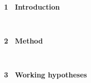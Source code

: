 \documentclass[portrait,a0,posterdraft]{a0poster} %
\def\exMinipage{782mm}
\def\exHalfMinipage{380mm}
\def\exSubHalfMinipage{369mm}
\begin{document}
{{{\begin{minipage}[t]{\exMinipage}
\begin{minipage}[t]{\exHalfMinipage}
\begin{minipage}[t]{\exHalfMinipage}%
\LARGE{\white \bf1 \ Introduction}\\[-10pt]
\begin{minipage}[t]{\exSubHalfMinipage}
\begin{mdframed}[style=smallframe]
\introtext
\end{mdframed}
\end{minipage} 
\end{minipage}%
\\[40pt]
\begin{minipage}[t]{\exHalfMinipage}%
\LARGE {\white  \bf 2 \ Method}\\[-10pt]
\begin{minipage}[t]{\exSubHalfMinipage}
\begin{mdframed}[style=smallframe]
\methodtext
\end{mdframed}
\end{minipage}
\end{minipage}%
\\[40pt]
\begin{minipage}[t]{\exHalfMinipage}%
\LARGE { \white \bf 3 \ Working hypotheses}\\[-10pt]
\begin{minipage}[t]{\exSubHalfMinipage}
\begin{mdframed}[style=smallframe]
\hypothesestext
\end{mdframed}
\end{minipage}
\end{minipage}%
\\[40pt]
\end{minipage}%
\hspace{0.2cm}
\begin{minipage}[t]{\exHalfMinipage}


\end{minipage}
\end{minipage}}}}
\end{document}
